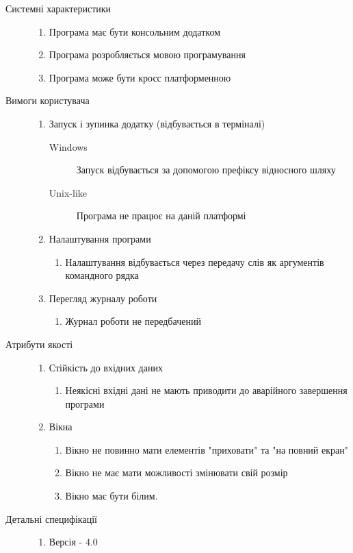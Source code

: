 \begin{description}
	\item[Системні характеристики]\directenv
		\begin{enumerate}
			\item Програма має бути консольним додатком
			\item Програма розробляється мовою програмування  
			\item Програма може бути кросс платформенною
		\end{enumerate}
	\item[Вимоги користувача]\directenv
		\begin{enumerate}
			\item Запуск і зупинка додатку (відбувається в терміналі)
				\begin{description}
					\item[Windows]
						Запуск відбувається за допомогою префіксу відносного шляху 
					\item[Unix-like]
						Програма не працює на даній платформі
				\end{description}
			\item Налаштування програми
				\begin{enumerate}
					\item Налаштування відбувається через передачу слів як аргументів командного рядка
				\end{enumerate}
			\item Перегляд журналу роботи
				\begin{enumerate}
					\item Журнал роботи не передбачений
				\end{enumerate}
		\end{enumerate}
	\item[Атрибути якості]\directenv
		\begin{enumerate}
			\item Стійкість до вхідних даних
				\begin{enumerate}
					\item Неякісні вхідні дані не мають приводити до аварійного завершення програми
				\end{enumerate}
			\item Вікна
				\begin{enumerate}
					\item Вікно не повинно мати елементів "приховати" та "на повний екран"
					\item Вікно не має мати можливості змінювати свій розмір
					\item Вікно має бути білим.
				\end{enumerate}
		\end{enumerate}
	\item[Детальні специфікації]\directenv
		\begin{enumerate}
			\item Версія  - 4.0
		\end{enumerate}
\end{description}


